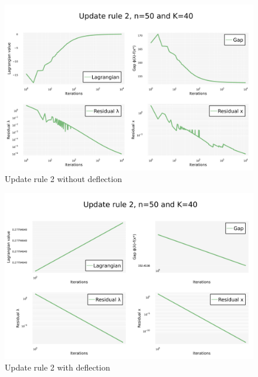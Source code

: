 \documentclass[notitlepage]{article}
\begin{document}
\begin{figure}[H]
  \centering
  \includegraphics[scale=0.25]{pics/psd_q/Rule=2_n=50_K=40_defl=false.png}
  \caption{Update rule 2 without deflection}
  \label{fig:rule-2-n-50-k-40-psdQ}
\end{figure}

\begin{figure}[H]
  \centering
  \includegraphics[scale=0.25]{pics/psd_q/Rule=2_n=50_K=40_defl=true.png}
  \caption{Update rule 2 with deflection}
  \label{fig:rule-2-n-50-k-40-defl-psdQ}
\end{figure}

\newpage
\end{document}
